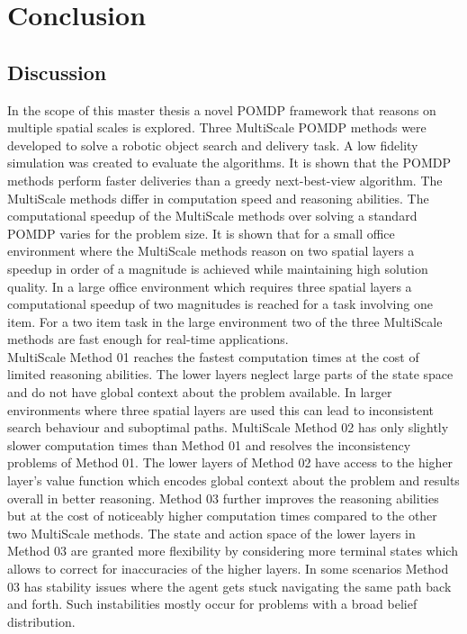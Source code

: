 \chapter{Conclusion}
\label{sec:conclusion}
\section{Discussion}
In the scope of this master thesis a novel POMDP framework that reasons on multiple spatial scales is explored. Three MultiScale POMDP methods were developed to solve a robotic object search and delivery task. A low fidelity simulation was created to evaluate the algorithms. It is shown that the POMDP methods perform faster deliveries than a greedy next-best-view algorithm. The MultiScale methods differ in computation speed and reasoning abilities. The computational speedup of the MultiScale methods over solving a standard POMDP varies for the problem size. It is shown that for a small office environment where the MultiScale methods reason on two spatial layers a speedup in order of a magnitude is achieved while maintaining high solution quality. In a large office environment which requires three spatial layers a computational speedup of two magnitudes is reached for a task involving one item. For a two item task in the large environment two of the three MultiScale methods are fast enough for real-time applications.\\

MultiScale Method 01 reaches the fastest computation times at the cost of limited reasoning abilities. The lower layers neglect large parts of the state space and do not have global context about the problem available. In larger environments where three spatial layers are used this can lead to inconsistent search behaviour and suboptimal paths. MultiScale Method 02 has only slightly slower computation times than Method 01 and resolves the inconsistency problems of Method 01. The lower layers of Method 02 have access to the higher layer's value function which encodes global context about the problem and results overall in better reasoning. Method 03 further improves the reasoning abilities but at the cost of noticeably higher computation times compared to the other two MultiScale methods. The state and action space of the lower layers in Method 03 are granted more flexibility by considering more terminal states which allows to correct for inaccuracies of the higher layers. In some scenarios Method 03 has stability issues where the agent gets stuck navigating the same path back and forth. Such instabilities mostly occur for problems with a broad belief distribution.


